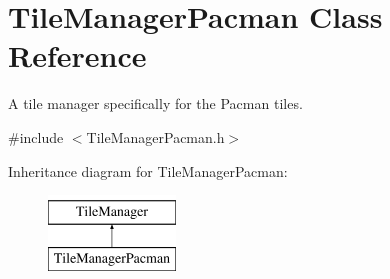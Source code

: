 \hypertarget{class_tile_manager_pacman}{}\section{Tile\+Manager\+Pacman Class Reference}
\label{class_tile_manager_pacman}


A tile manager specifically for the Pacman tiles.  




{\ttfamily \#include $<$Tile\+Manager\+Pacman.\+h$>$}

Inheritance diagram for Tile\+Manager\+Pacman\+:\begin{figure}[H]
\begin{center}
\leavevmode
\includegraphics[height=2.000000cm]{class_tile_manager_pacman}
\end{center}
\end{figure}
